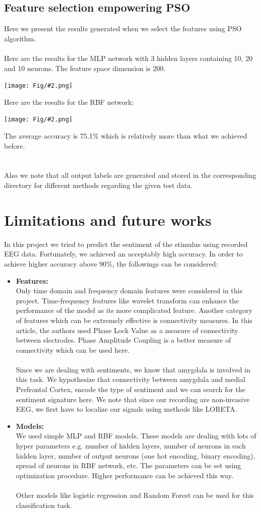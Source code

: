 \documentclass[]{article}
\newcommand{\pict}[2]{\begin{center}
		\texttt{[image: Fig/\#2.png]}
\end{center}}
\begin{document}
	\subsection{Feature selection empowering PSO}
	Here we present the results generated when we select the features using PSO algorithm.\\\\
	Here are the results for the MLP network with 3 hidden layers containing 10, 20 and 10 neurons. The feature space dimension is 200. 
	\pict{0.6}{F10}
	Here are the results for the RBF network:
	\pict{0.6}{F11}
	The average accuracy is 75.1\% which is relatively more than what we achieved before.\\\\\\
	Also we note that all output labels are generated and stored in the corresponding directory for different methods regarding the given test data.
	
	\section{Limitations and future works}
	In this project we tried to predict the sentiment of the stimulus using recorded EEG data. Fortunately, we achieved an acceptably high accuracy. In order to achieve higher accuracy above 90\%, the followings can be considered:
	\begin{itemize}
		\item \textbf{Features:}\\
		Only time domain and frequency domain features were considered in this project. Time-frequency features like wavelet transform can enhance the performance of the model as its more complicated feature. Another category of features which can be extremely effective is connectivity measures. In this article, the authors used Phase Lock Value as a measure of connectivity between electrodes. Phase Amplitude Coupling is a better measure of connectivity which can be used here.\\\\
		Since we are dealing with sentiments, we know that amygdala is involved in this task. We hypothesize that connectivity between amygdala and medial Prefrontal Cortex, encode the type of sentiment and we can search for the sentiment signature here. We note that since our recording are non-invasive EEG, we first have to localize our signals using methods like LORETA.
		
		\item \textbf{Models:}\\
		We used simple MLP and RBF models. These models are dealing with lots of hyper parameters e.g. number of hidden layers, number of neurons in each hidden layer, number of output neurons (one hot encoding, binary encoding), spread of neurons in RBF network, etc. The parameters can be set using optimization procedure. Higher performance can be achieved this way.\\\\
		Other models like logistic regression and Random Forest can be used for this classification task.
	\end{itemize}
	
\end{document}
